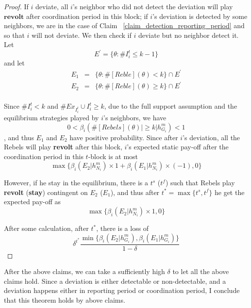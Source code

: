 \documentclass[12pt,letter]{article}
\theoremstyle{definition}
\theoremstyle{remark}
\theoremstyle{claim}
\begin{document}
\begin{proof}


If $i$ deviate, all $i$'s neighbor who did not detect the deviation will play $\textbf{revolt}$ after coordination period in this block; if $i$'s deviation is detected by some neighbors, we are in the case of Claim ~\ref{claim_detection_reporting_period} and so that $i$ will not deviate. We then check if $i$ deviate but no neighbor detect it.
Let 
\[E^{'}=\{\theta:\#I^{t}_i\leq k-1\}\]
and let 
\begin{eqnarray*}
E_1&=&\{\theta: \#[Reble](\theta)<k\}\cap E^{'}\\
E_2&=&\{\theta: \#[Reble](\theta)\geq k\}\cap E^{'}\\
\end{eqnarray*}

Since $\# I^t_i<k$ and $\# Ex_{I^{t}_i}\cup I^{t}_i \geq k$, due to the full support assumption and the equilibrium strategies played by $i$'s neighbors, we have 
\[0<\beta_{i}(\#[Rebels](\theta)|\geq k|h^{m}_{G_i})<1\], and thus $E_1$ and $E_2$ have positive probability. Since after $i$'s deviation, all the Rebels will play \textbf{revolt} after this block, $i$'s expected static pay-off after the coordination period in this $t$-block is at most 
\[
{\max\{\beta_{i}(E_2|h^{m}_{N_i})\times 1+\beta_{i}(E_1|h^{m}_{N_i})\times (-1), 0\}}
\]

However, if he stay in the equilibrium, there is a $t^s$ ($t^f$) such that Rebels play \textbf{revolt} (\textbf{stay}) contingent on $E_2$ ($E_1$), and thus after $t^*=\max\{t^s,t^f\}$ he get the expected pay-off as
\[
{\max\{\beta_{i}(E_2|h^{m}_{N_i})\times 1, 0\}}
\]

After some calculation, after $t^*$, there is a loss of
\[\delta^{t^{*}}\frac{\min\{\beta_{i}(E_2|h^{m}_{G_i}),\beta_{i}(E_1|h^{m}_{G_i})\}}{1-\delta}\]

\end{proof}

After the above claims, we can take a sufficiently high $\delta$ to let all the above claims hold. Since a deviation is either detectable or non-detectable, and a deviation happens either in reporting period or coordination period, I conclude that this theorem holds by above claims. 
\end{document}

